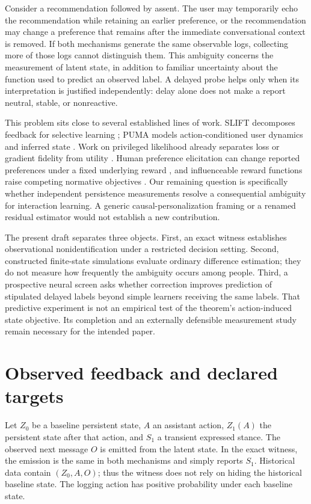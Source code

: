 \documentclass{article}
\begin{document}
Consider a recommendation followed by assent. The user may temporarily echo
the recommendation while retaining an earlier preference, or the recommendation
may change a preference that remains after the immediate conversational context
is removed. If both mechanisms generate the same observable logs, collecting
more of those logs cannot distinguish them. This ambiguity concerns the
measurement of latent state, in addition to familiar uncertainty about the
function used to predict an observed label. A delayed probe helps only when
its interpretation is justified independently: delay alone does not make a
report neutral, stable, or nonreactive.

This problem sits close to several established lines of work. SLIFT decomposes
feedback for selective learning \citep{slift}; PUMA models action-conditioned
user dynamics and inferred state \citep{puma}. Work on privileged likelihood
already separates loss or gradient fidelity from utility
\citep{privilegedlikelihood}. Human preference elicitation can change reported
preferences under a fixed underlying reward \citep{influencing}, and influenceable
reward functions raise competing normative objectives \citep{carroll2024}.
Our remaining question is specifically whether independent persistence
measurements resolve a consequential ambiguity for interaction learning. A
generic causal-personalization framing or a renamed residual estimator would
not establish a new contribution.

The present draft separates three objects. First, an exact witness establishes
observational nonidentification under a restricted decision setting. Second,
constructed finite-state simulations evaluate ordinary difference estimation;
they do not measure how frequently the ambiguity occurs among people. Third,
a prospective neural screen asks whether correction improves prediction of
stipulated delayed labels beyond simple learners receiving the same labels.
That predictive experiment is not an empirical test of the theorem's
action-induced state objective. Its completion and an externally defensible
measurement study remain necessary for the intended paper.

\section{Observed feedback and declared targets}
Let $Z_0$ be a baseline persistent state, $A$ an assistant action, $Z_1(A)$ the
persistent state after that action, and $S_1$ a transient expressed stance.
The observed next message $O$ is emitted from the latent state. In the exact
witness, the emission is the same in both mechanisms and simply reports $S_1$.
Historical data contain $(Z_0,A,O)$; thus the witness does not rely on hiding
the historical baseline state. The logging action has positive probability
under each baseline state.
\end{document}

